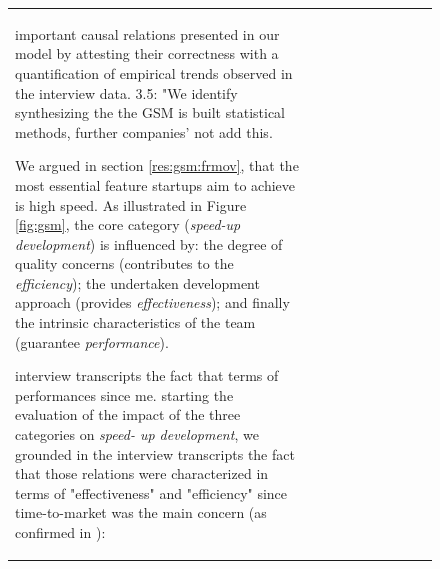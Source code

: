 \documentclass[12pt,journal,compsoc]{../sty/IEEEtran}
\begin{document}
\begin{table}[!t]
\begin{figure}[!t]
\begin{compactitem}
\begin{table}[!t]
\begin{tabular}{|l||c||c||c||c||c||c||c||c||c|}
important causal relations presented in  our model by attesting their
correctness  with a quantification of empirical  trends observed in the
interview data.  %
3.5: "We identify  %
synthesizing the  %
the GSM is built  %
statistical methods,  %
further companies'  %
not add this.

We argued in section \ref{res:gsm:frmov}, that the most essential feature
startups aim to achieve is high speed. As illustrated in Figure \ref{fig:gsm},
the core category (\textit{speed-up development}) is influenced by: the degree
of quality concerns (contributes to the \textit{efficiency}); the undertaken
development approach (provides \textit{effectiveness}); and finally the
intrinsic characteristics of the team (guarantee \textit{performance}).

interview transcripts the fact that  %
terms of performances since  %
me.  %
starting the evaluation of the impact of the three categories on  \textit{speed-
up development}, we grounded in the interview transcripts the fact  that those
relations were characterized in terms of "effectiveness" and  "efficiency" since
time-to-market was the main concern (as confirmed in  \cite{SMS}):


\end{tabular}
\end{table}
\end{compactitem}
\end{figure}
\end{table}
\end{document}
